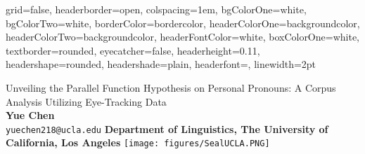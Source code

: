 \documentclass[a0paper,portrait]{baposter}
\begin{document}
\begin{poster}
{
grid=false,
headerborder=open, %
colspacing=1em, %
bgColorOne=white, %
bgColorTwo=white, %
borderColor=bordercolor, %
headerColorOne=backgroundcolor, %
headerColorTwo=backgroundcolor, %
headerFontColor=white, %
boxColorOne=white, %
textborder=rounded, %
eyecatcher=false, %
headerheight=0.11\textheight, %
headershape=rounded, %
headershade=plain,
headerfont=\Large\textsf, %
linewidth=2pt %
}

%
%
{
\vspace{0.5em}
\textsf{Unveiling the Parallel Function Hypothesis on Personal Pronouns: A Corpus Analysis Utilizing Eye-Tracking Data}
}
{
\sf\vspace{-0.1em} \\
\textbf{Yue Chen}\\
\small{\texttt{yuechen218@ucla.edu} \quad \textbf{Department of Linguistics, The University of California, Los Angeles}}
}
{\texttt{[image: figures/SealUCLA.PNG]}}




\end{poster}
\end{document}
